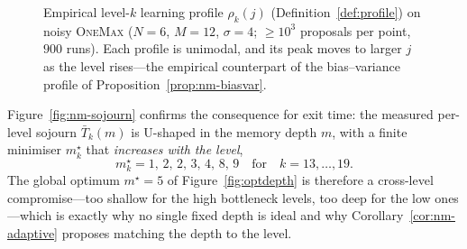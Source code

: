 \documentclass[11pt,a4paper]{article}
\begin{document}
\begin{figure}[ht]
\centering
{}
\caption{Empirical level-$k$ learning profile $\rho_k(j)$
  (Definition~\ref{def:profile}) on noisy \textsc{OneMax}
  ($N=6$, $M=12$, $\sigma=4$; $\ge10^3$ proposals per point, $900$ runs).
  Each profile is unimodal, and its peak moves to larger $j$ as the level
  rises---the empirical counterpart of the bias--variance profile of
  Proposition~\ref{prop:nm-biasvar}.}
\label{fig:nm-profile}
\end{figure}

Figure~\ref{fig:nm-sojourn} confirms the consequence for exit time: the
measured per-level sojourn $\bar T_k(m)$ is U-shaped in the memory depth
$m$, with a finite minimiser $m_k^\star$ that \emph{increases with the
level},
\[
  m_k^\star = 1,\,2,\,2,\,3,\,4,\,8,\,9 \quad\text{for}\quad k=13,\dots,19 .
\]
The global optimum $m^\star=5$ of Figure~\ref{fig:optdepth} is therefore a
cross-level compromise---too shallow for the high bottleneck levels, too
deep for the low ones---which is exactly why no single fixed depth is
ideal and why Corollary~\ref{cor:nm-adaptive} proposes matching the depth
to the level.
\end{document}
